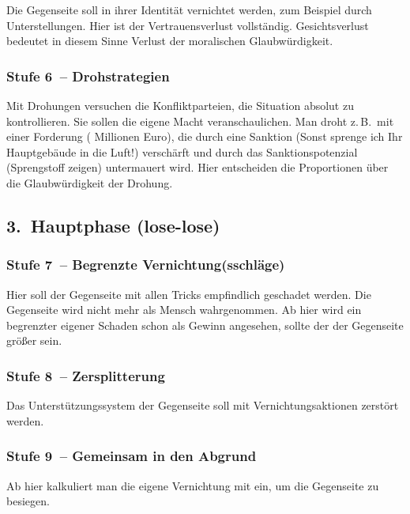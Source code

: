 Die Gegenseite soll in ihrer Identität vernichtet werden, zum Beispiel durch Unterstellungen. Hier ist der Vertrauensverlust vollständig. Gesichtsverlust bedeutet in diesem Sinne Verlust der moralischen Glaubwürdigkeit.

\subsubsection{Stufe 6~-- Drohstrategien}

Mit Drohungen versuchen die Konfliktparteien, die Situation absolut zu kontrollieren. Sie sollen die eigene Macht veranschaulichen. Man droht z.\,B.~mit einer Forderung ( Millionen Euro\grqq), die durch eine Sanktion (\glqq Sonst sprenge ich Ihr Hauptgebäude in die Luft!\grqq) verschärft und durch das Sanktionspotenzial (Sprengstoff zeigen) untermauert wird. Hier entscheiden die Proportionen über die Glaubwürdigkeit der Drohung.


\subsection{3.~Hauptphase (lose-lose)}

\subsubsection{Stufe 7~-- Begrenzte Vernichtung(sschläge)}

Hier soll der Gegenseite mit allen Tricks empfindlich geschadet werden. Die Gegenseite wird nicht mehr als Mensch wahrgenommen. Ab hier wird ein begrenzter eigener Schaden schon als Gewinn angesehen, sollte der der Gegenseite größer sein.

\subsubsection{Stufe 8~-- Zersplitterung}

Das Unterstützungssystem der Gegenseite soll mit Vernichtungsaktionen zerstört werden.

\subsubsection{Stufe 9~-- Gemeinsam in den Abgrund}

Ab hier kalkuliert man die eigene Vernichtung mit ein, um die Gegenseite zu besiegen.
